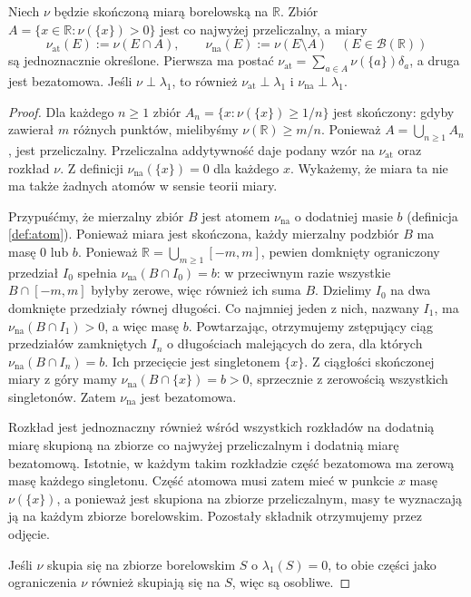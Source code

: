 \begin{twierdzenie}
\label{thm:atomic-cont-singular-17}
Niech $\nu$ będzie skończoną miarą borelowską na
$\mathbb R$. Zbiór
$A=\{x\in\mathbb R:\nu(\{x\})>0\}$ jest co najwyżej
przeliczalny, a miary
\[
 \nu_{\mathrm{at}}(E):=\nu(E\cap A),\qquad
 \nu_{\mathrm{na}}(E):=\nu(E\setminus A)
 \quad(E\in\mathcal B(\mathbb R))
\]
są jednoznacznie określone. Pierwsza ma postać
$\nu_{\mathrm{at}}=\sum_{a\in A}\nu(\{a\})\delta_a$,
a druga jest bezatomowa. Jeśli $\nu\perp\lambda_1$,
to również $\nu_{\mathrm{at}}\perp\lambda_1$ i
$\nu_{\mathrm{na}}\perp\lambda_1$.
\end{twierdzenie}
\begin{proof}
Dla każdego $n\ge1$ zbiór
$A_n=\{x:\nu(\{x\})\ge1/n\}$ jest skończony:
gdyby zawierał $m$ różnych punktów, mielibyśmy
$\nu(\mathbb R)\ge m/n$. Ponieważ
$A=\bigcup_{n\ge1}A_n$, jest przeliczalny.
Przeliczalna addytywność daje podany wzór na
$\nu_{\mathrm{at}}$ oraz rozkład $\nu$.
Z definicji $\nu_{\mathrm{na}}(\{x\})=0$ dla
każdego $x$. Wykażemy, że miara ta nie ma także
żadnych atomów w sensie teorii miary.

Przypuśćmy, że mierzalny zbiór $B$ jest atomem
$\nu_{\mathrm{na}}$ o dodatniej masie $b$ (definicja \ref{def:atom}).
Ponieważ miara jest skończona, każdy mierzalny podzbiór $B$
ma masę $0$ lub $b$.
Ponieważ $\mathbb R=\bigcup_{m\ge1}[-m,m]$,
pewien domknięty ograniczony przedział $I_0$
spełnia $\nu_{\mathrm{na}}(B\cap I_0)=b$: w przeciwnym razie
wszystkie $B\cap[-m,m]$ byłyby zerowe, więc również ich suma $B$.
Dzielimy $I_0$ na dwa domknięte przedziały równej
długości. Co najmniej jeden z nich, nazwany $I_1$,
ma $\nu_{\mathrm{na}}(B\cap I_1)>0$, a więc masę $b$.
Powtarzając, otrzymujemy zstępujący ciąg przedziałów
zamkniętych $I_n$ o długościach malejących do zera,
dla których $\nu_{\mathrm{na}}(B\cap I_n)=b$.
Ich przecięcie jest singletonem $\{x\}$.
Z ciągłości skończonej miary z góry mamy
$\nu_{\mathrm{na}}(B\cap\{x\})=b>0$,
sprzecznie z zerowością wszystkich singletonów.
Zatem $\nu_{\mathrm{na}}$ jest bezatomowa.

Rozkład jest jednoznaczny również wśród wszystkich
rozkładów na dodatnią miarę skupioną na zbiorze
co najwyżej przeliczalnym i dodatnią miarę bezatomową.
Istotnie, w każdym takim rozkładzie część bezatomowa
ma zerową masę każdego singletonu. Część atomowa
musi zatem mieć w punkcie $x$ masę $\nu(\{x\})$,
a ponieważ jest skupiona na zbiorze przeliczalnym,
masy te wyznaczają ją na każdym zbiorze borelowskim.
Pozostały składnik otrzymujemy przez odjęcie.

Jeśli $\nu$ skupia się na zbiorze borelowskim $S$
o $\lambda_1(S)=0$, to obie części jako ograniczenia
$\nu$ również skupiają się na $S$, więc są osobliwe.
\end{proof}

